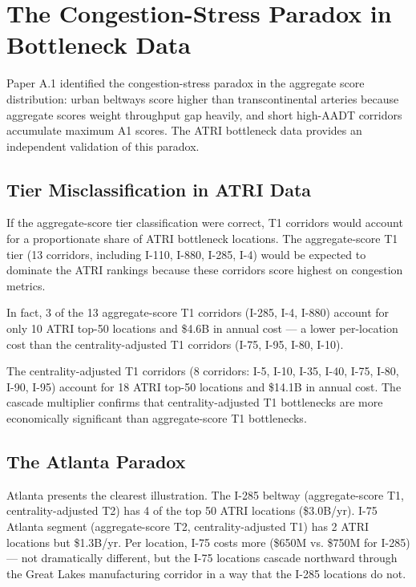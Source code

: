 \section{The Congestion-Stress Paradox in Bottleneck Data}

Paper A.1 identified the congestion-stress paradox in the aggregate score distribution: urban beltways score higher than transcontinental arteries because aggregate scores weight throughput gap heavily, and short high-AADT corridors accumulate maximum A1 scores. The ATRI bottleneck data provides an independent validation of this paradox.

\subsection{Tier Misclassification in ATRI Data}

If the aggregate-score tier classification were correct, T1 corridors would account for a proportionate share of ATRI bottleneck locations. The aggregate-score T1 tier (13 corridors, including I-110, I-880, I-285, I-4) would be expected to dominate the ATRI rankings because these corridors score highest on congestion metrics.

In fact, 3 of the 13 aggregate-score T1 corridors (I-285, I-4, I-880) account for only 10 ATRI top-50 locations and \$4.6B in annual cost --- a lower per-location cost than the centrality-adjusted T1 corridors (I-75, I-95, I-80, I-10).

The centrality-adjusted T1 corridors (8 corridors: I-5, I-10, I-35, I-40, I-75, I-80, I-90, I-95) account for 18 ATRI top-50 locations and \$14.1B in annual cost. The cascade multiplier confirms that centrality-adjusted T1 bottlenecks are more economically significant than aggregate-score T1 bottlenecks.

\subsection{The Atlanta Paradox}

Atlanta presents the clearest illustration. The I-285 beltway (aggregate-score T1, centrality-adjusted T2) has 4 of the top 50 ATRI locations (\$3.0B/yr). I-75 Atlanta segment (aggregate-score T2, centrality-adjusted T1) has 2 ATRI locations but \$1.3B/yr. Per location, I-75 costs more (\$650M vs. \$750M for I-285) --- not dramatically different, but the I-75 locations cascade northward through the Great Lakes manufacturing corridor in a way that the I-285 locations do not.

